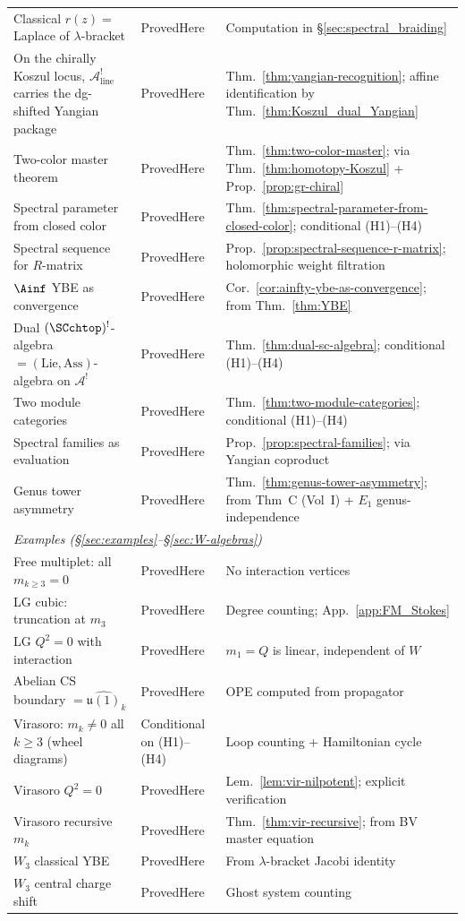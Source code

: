 \begin{center}
\begin{tabular}{p{}p{}p{}}
Classical $r(z) = $ Laplace of $\lambda$-bracket & ProvedHere & Computation in \S\ref{sec:spectral_braiding} \\
On the chirally Koszul locus, $\mathcal{A}^!_{\mathrm{line}}$ carries the dg-shifted Yangian package & ProvedHere & Thm.~\ref{thm:yangian-recognition}; affine identification by Thm.~\ref{thm:Koszul_dual_Yangian} \\
Two-color master theorem & ProvedHere & Thm.~\ref{thm:two-color-master}; via Thm.~\ref{thm:homotopy-Koszul} + Prop.~\ref{prop:gr-chiral} \\
Spectral parameter from closed color & ProvedHere & Thm.~\ref{thm:spectral-parameter-from-closed-color}; conditional (H1)--(H4) \\
Spectral sequence for $R$-matrix & ProvedHere & Prop.~\ref{prop:spectral-sequence-r-matrix}; holomorphic weight filtration \\
$\Ainf$ YBE as convergence & ProvedHere & Cor.~\ref{cor:ainfty-ybe-as-convergence}; from Thm.~\ref{thm:YBE} \\
Dual $(\SCchtop)^{!}$-algebra $= (\mathrm{Lie},\mathrm{Ass})$-algebra on $\mathcal{A}^!$ & ProvedHere & Thm.~\ref{thm:dual-sc-algebra}; conditional (H1)--(H4) \\
Two module categories & ProvedHere & Thm.~\ref{thm:two-module-categories}; conditional (H1)--(H4) \\
Spectral families as evaluation & ProvedHere & Prop.~\ref{prop:spectral-families}; via Yangian coproduct \\
Genus tower asymmetry & ProvedHere & Thm.~\ref{thm:genus-tower-asymmetry}; from Thm~C (Vol~I) + $E_1$ genus-independence \\
\hline
\multicolumn{3}{l}{\emph{Examples (\S\ref{sec:examples}--\S\ref{sec:W-algebras})}} \\
Free multiplet: all $m_{k\geq 3}=0$ & ProvedHere & No interaction vertices \\
LG cubic: truncation at $m_3$ & ProvedHere & Degree counting; App.~\ref{app:FM_Stokes} \\
LG $Q^2=0$ with interaction & ProvedHere & $m_1=Q$ is linear, independent of $W$ \\
Abelian CS boundary $= \widehat{\mathfrak{u}(1)}_k$ & ProvedHere & OPE computed from propagator \\
Virasoro: $m_k \ne 0$ all $k \ge 3$ (wheel diagrams) & Conditional on (H1)--(H4) & Loop counting + Hamiltonian cycle \\
Virasoro $Q^2=0$ & ProvedHere & Lem.~\ref{lem:vir-nilpotent}; explicit verification \\
Virasoro recursive $m_k$ & ProvedHere & Thm.~\ref{thm:vir-recursive}; from BV master equation \\
$W_3$ classical YBE & ProvedHere & From $\lambda$-bracket Jacobi identity \\
$W_3$ central charge shift & ProvedHere & Ghost system counting \\
\end{tabular}
\end{center}

